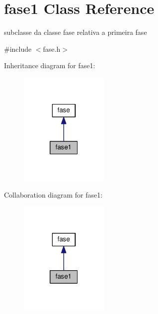 \hypertarget{classfase1}{}\section{fase1 Class Reference}
\label{classfase1}


subclasse da classe fase relativa a primeira fase  




{\ttfamily \#include $<$fase.\+h$>$}



Inheritance diagram for fase1\+:\nopagebreak
\begin{figure}[H]
\begin{center}
\leavevmode
\includegraphics[width=121pt]{classfase1__inherit__graph}
\end{center}
\end{figure}


Collaboration diagram for fase1\+:\nopagebreak
\begin{figure}[H]
\begin{center}
\leavevmode
\includegraphics[width=121pt]{classfase1__coll__graph}
\end{center}
\end{figure}
